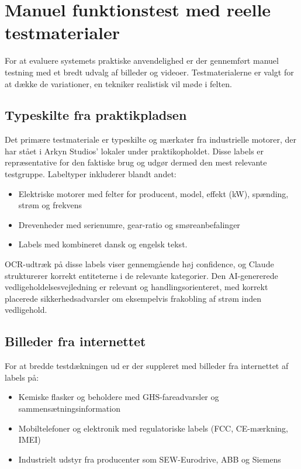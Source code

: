 \section{Manuel funktionstest med reelle testmaterialer}
\label{sec:manuel-test}

For at evaluere systemets praktiske anvendelighed er der gennemført manuel testning med et bredt udvalg af billeder og videoer. Testmaterialerne er valgt for at dække de variationer, en tekniker realistisk vil møde i felten.

\subsection{Typeskilte fra praktikpladsen}
\label{subsec:motor-test}

Det primære testmateriale er typeskilte og mærkater fra industrielle motorer, der har stået i Arkyn Studios' lokaler under praktikopholdet. Disse labels er repræsentative for den faktiske brug og udgør dermed den mest relevante testgruppe. Labeltyper inkluderer blandt andet:

\begin{itemize}
  \item Elektriske motorer med felter for producent, model, effekt (kW), spænding, strøm og frekvens
  \item Drevenheder med serienumre, gear-ratio og smøreanbefalinger
  \item Labels med kombineret dansk og engelsk tekst.
\end{itemize}

OCR-udtræk på disse labels viser gennemgående høj confidence, og Claude strukturerer korrekt entiteterne i de relevante kategorier. Den AI-genererede vedligeholdelsesvejledning er relevant og handlingsorienteret, med korrekt placerede sikkerhedsadvarsler om eksempelvis frakobling af strøm inden vedligehold.

\subsection{Billeder fra internettet}
\label{subsec:internet-test}

For at bredde testdækningen ud er der suppleret med billeder fra internettet af labels på:

\begin{itemize}
  \item Kemiske flasker og beholdere med GHS-fareadvarsler og sammensætningsinformation
  \item Mobiltelefoner og elektronik med regulatoriske labels (FCC, CE-mærkning, IMEI)
  \item Industrielt udstyr fra producenter som SEW-Eurodrive, ABB og Siemens
\end{itemize}

